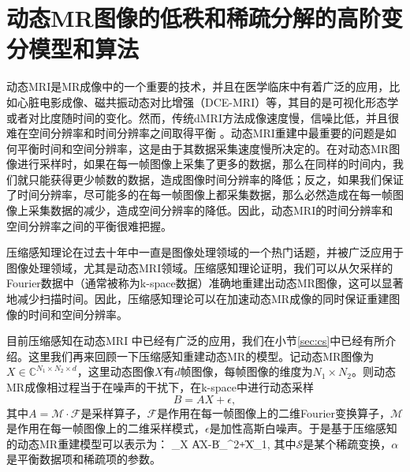 
\chapter{动态MR图像的低秩和稀疏分解的高阶变分模型和算法}
\label{chap:tgvlr}
动态MRI是MR成像中的一个重要的技术，并且在医学临床中有着广泛的应用，比如心脏电影成像、磁共振动态对比增强（DCE-MRI）\cite{Yankeelov2009}等，其目的是可视化形态学或者对比度随时间的变化。然而，传统dMRI方法成像速度慢，信噪比低，并且很难在空间分辨率和时间分辨率之间取得平衡 \cite{van1993, Jeffrey2003k}。动态MRI重建中最重要的问题是如何平衡时间和空间分辨率，这是由于其数据采集速度慢所决定的。在对动态MR图像进行采样时，如果在每一帧图像上采集了更多的数据，那么在同样的时间内，我们就只能获得更少帧数的数据，造成图像时间分辨率的降低；反之，如果我们保证了时间分辨率，尽可能多的在每一帧图像上都采集数据，那么必然造成在每一帧图像上采集数据的减少，造成空间分辨率的降低。因此，动态MRI的时间分辨率和空间分辨率之间的平衡很难把握。

压缩感知理论\cite{Candes2006Robust}\cite{Donoho2006Compressed}在过去十年中一直是图像处理领域的一个热门话题，并被广泛应用于图像处理领域，尤其是动态MRI\cite{lustig2006,zhaobo,Sajan2011Accelerated,dmrics,kalman,lpluss,han}领域。压缩感知理论证明，我们可以从欠采样的Fourier数据中（通常被称为k-space数据）准确地重建出动态MR图像，这可以显著地减少扫描时间\cite{lustig2006, Lustig2008Compressed}。因此，压缩感知理论可以在加速动态MR成像的同时保证重建图像的时间和空间分辨率。

目前压缩感知在动态MRI\cite{zhaobo,Sajan2011Accelerated,dmrics,kalman,lpluss} 中已经有广泛的应用，我们在小节\ref{sec:cs}中已经有所介绍。这里我们再来回顾一下压缩感知重建动态MR的模型。记动态MR图像为$X\in \mathbb{C}^{N_1\times N_2\times d}$，这里动态图像$X$有$d$帧图像，每帧图像的维度为$N_1\times N_2$。则动态MR成像相过程当于在噪声的干扰下，在k-space中进行动态采样
$$B=AX+\epsilon,$$
其中$A=\mathcal{M}\cdot\mathcal{F}$是采样算子，$\mathcal{F}$是作用在每一帧图像上的二维Fourier变换算子，$\mathcal{M}$是作用在每一帧图像上的二维采样模式，$\epsilon$是加性高斯白噪声。于是基于压缩感知的动态MR重建模型可以表示为：
\beq
\min_X \|AX-B\|_{}^2+\alpha\|X\|_1,
\eeq
其中$\mathcal{S}$是某个稀疏变换，$\alpha$是平衡数据项和稀疏项的参数。


